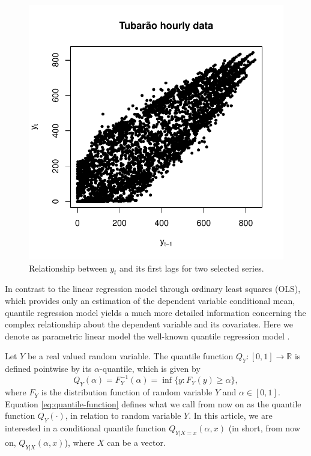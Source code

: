 \begin{figure}
\begin{minipage}[t]{\linewidth}
\begin{minipage}[t]{0.45\linewidth}
      \centering     \includegraphics[width=\textwidth]{Figuras/Solar-exemplos/scatterplot}
    \end{minipage}
  \end{minipage}
  \caption{Relationship between $y_t$ and its first lags for two selected series.}
  \label{fig:scatterplot-1lag}
\end{figure}

In contrast to the linear regression model through ordinary least squares (OLS), which provides only an estimation of the dependent variable conditional mean, quantile regression model yields a much more detailed information concerning the complex relationship about the dependent variable and its covariates. Here we denote as parametric linear model the well-known quantile regression model \cite{koenker2005quantile}.

Let $Y$ be a real valued random variable. The quantile function $Q_Y:[0,1] \rightarrow \mathbb{R}$ is defined pointwise by its $\alpha$-quantile, which is given by
\begin{equation}
Q_Y(\alpha) = F_Y^{-1}(\alpha) = \inf\{y: F_Y(y) \geq \alpha\},
\label{eq:quantile-function}
\end{equation}
where $F_Y$ is the distribution function of random variable $Y$ and $\alpha \in [0,1]$. Equation \ref{eq:quantile-function} defines what we call from now on as the quantile function $Q_Y(\cdot)$, in relation to random variable $Y$. In this article, we are interested in a conditional quantile function $Q_{Y|X=x}(\alpha, x)$ (in short, from now on, $Q_{Y|X}(\alpha, x)$), where $X$ can be a vector.

